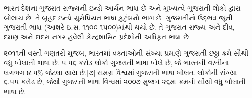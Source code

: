 \documentclass[a4paper,12pt,oneside,final]{article}
\begin{document}
 ભારત દેશના ગુજરાત રાજ્યની ઇન્ડો-આર્યન ભાષા છે અને મુખ્યત્વે ગુજરાતી લોકો દ્વારા બોલાય છે. તે બૃહદ ઇન્ડો-યુરોપિયન ભાષા કુટુંબનો ભાગ છે. ગુજરાતીનો ઉદ્ભવ જૂની ગુજરાતી ભાષા (આશરે ઇ.સ. ૧૧૦૦-૧૫૦૦)માંથી થયો છે. તે ગુજરાત રાજ્ય અને દીવ, દમણ અને દાદરા-નગર હવેલી કેન્દ્રશાસિત પ્રદેશોની અધિકૃત ભાષા છે.

૨૦૧૧ની વસ્તી ગણતરી મુજબ, ભારતમાં વક્તાઓની સંખ્યા પ્રમાણે ગુજરાતી છઠ્ઠા ક્રમે સૌથી વધુ બોલાતી ભાષા છે. ૫.૫૬ કરોડ લોકો ગુજરાતી ભાષા બોલે છે, જે ભારતની વસ્તીના લગભગ ૪.૫\% જેટલા થાય છે.[૭] સમગ્ર વિશ્વમાં ગુજરાતી ભાષા બોલતા લોકોની સંખ્યા ૬.૫૫ કરોડ છે, જેથી ગુજરાતી ભાષા વિશ્વમાં ૨૦૦૭ મુજબ ૨૬મા ક્રમની સૌથી વધુ બોલાતી ભાષા છે.
\end{document}
